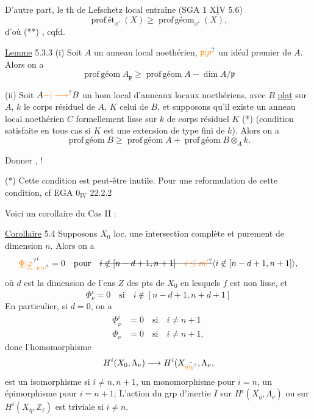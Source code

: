 D'autre part, le th de Lefschetz local entraîne (SGA 1 $\overline{\underline{\mathrm{XIV}}}$ 5.6)
\[
\operatorname{prof\,ét}_{x'}(X)\geq\operatorname{prof\,géom}_{x'}(X),
\]
d'où  (**) , cqfd.


\uline{Lemme} 5.3.3 (i) Soit $A$ un anneau local noethérien, $\unsure{\mathfrak{p}|p}$ un idéal premier de $A$. Alors on a
\[
\operatorname{prof\,géom}A_{\mathfrak{p}}\geq\operatorname{prof\,géom}A-\dim A/\mathfrak{p}
\]

(ii) Soit $A\unsure{-|\longrightarrow}B$ un hom local d'anneaux locaux noethériens, avec $B$ \uline{plat} sur $A$, $k$ le corps résiduel de $A$, $K$ celui de $B$, et supposons qu'il existe un anneau local noethérien $C$  formellement lisse sur $k$ de corps résiduel $K$ (*) (condition satisfaite en tous cas si $K$ est une extension de type fini de $k$). Alors on a
\[
\operatorname{prof\,géom}B\geq\operatorname{prof\,géom}A+\operatorname{prof\,géom}B\otimes_A k.
\]

Donner , !

(*) Cette condition est peut-être inutile. Pour une reformulation de cette condition, cf EGA $0_{\mathrm{IV}}$ 22.2.2

Voici un corollaire du Cas II :

\uline{Corollaire} 5.4 Supposons  $X_0$ loc. une intersection complète et purement de dimension $n$. Alors on a
\[
{\unsure{\underline{\Phi}|\underline{\varphi}}}^i_{\unsure{\nu|v}}=0\quad\text{pour}\quad
\deleted{i\notin[n-d+1,n+1]\quad\unsure{i\leq m'}}\inserted{i\notin[n-d+1,n+1]},
\]
où $d$ est la dimension de l'ens $Z$ des pts de $X_0$ en lesquels $f$ est non lisse,  et
\[
\Phi^i_\nu=0\quad\text{si}\quad i\notin[n-d+1,n+d+1]
\]
En particulier, si $d=0$, on a
\[
\begin{aligned}
\underline{\Phi}^i_\nu&=0\quad\text{si}\quad i\neq n+1\\
\Phi_\nu&=0\quad\text{si}\quad i\neq n+1,
\end{aligned}
\]
donc l'homomorphisme
\[
H^i(X_0,\Lambda_\nu)\longrightarrow H^i(X_{\bar{\unsure{\eta|y}}},\Lambda_\nu,
\]
est un isomorphisme si $i\neq n,n+1$, un monomorphisme pour $i=n$, un épimorphisme pour $i=n+1$;  L'action du grp d'inertie  $I$ sur $H^i(X_{\bar{\eta}},\Lambda_\nu)$  ou sur $H^i(X_{\bar{\eta}},\mathbb{Z}_\ell)$ est triviale si $i\neq n$.

